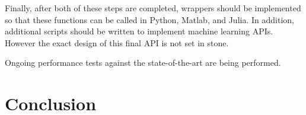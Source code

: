 \documentclass{article}
\theoremstyle{exampstyle} \newtheorem*{remark}{Remark}
\newcommand{\1}{\mathds{1}}
\begin{document}
Finally, after both of these steps are completed, wrappers should be implemented so that these functions can be called in Python, Matlab, and Julia. In addition, additional scripts should be written to implement machine learning APIs. However the exact design of this final API is not set in stone.

Ongoing performance tests against the state-of-the-art are being performed.

\section{Conclusion}


\begin{comment}
\section{Results}

$$ FORTHCOMING $$

\section{Discussion}

$$ FORTHCOMING $$
\end{comment}
\end{document}
